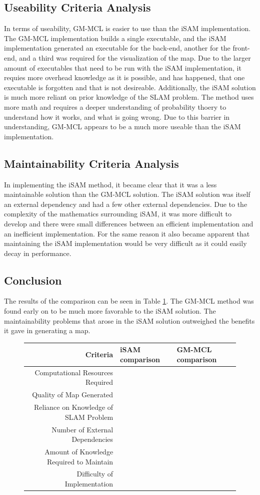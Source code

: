 \documentclass[10pt]{IEEEtran}
\begin{document}
\subsection{Useability Criteria Analysis}
In terms of useability, GM-MCL is easier to use than the iSAM implementation.  The GM-MCL
implementation builds a single executable, and the iSAM implementation generated an
executable for the back-end, another for the front-end, and a third was required for the
visualization of the map.  Due to the larger amount of executables that need to be run with
the iSAM implementation, it requies more overhead knowledge as it is possible, and has happened,
that one executable is forgotten and that is not desireable.  Additionally, the iSAM solution
is much more reliant on prior knowledge of the SLAM problem.  The method uses more math and 
requires a deeper understanding of probability thoery to understand how it works, and what is
going wrong.  Due to this barrier in understanding, GM-MCL appears to be a much more useable
than the iSAM implementation.

\subsection{Maintainability Criteria Analysis}
In implementing the iSAM method, it became clear that it was a less maintainable solution
than the GM-MCL solution.  The iSAM solution was itself an external dependency and had a few 
other external dependencies.  Due to the complexity of the mathematics surrounding iSAM, it
was more difficult to develop and there were small differences between an efficient
implementation and an inefficient implementation.  For the same reason it also became
apparent that maintaining the iSAM implementation would be very difficult as it could easily
decay in performance.

\subsection{Conclusion}
The results of the comparison can be seen in Table \ref{fig:CriteriaComp}.  The GM-MCL
method was found early on to be much more favorable to the iSAM solution.  The maintainability
problems that arose in the iSAM solution outweighed the benefits it gave in generating a map.
\begin{figure}
\begin{tabular} { r | l  | l}
	Criteria & iSAM comparison & GM-MCL comparison \\ 
	\hline Computational Resources Required & &\\
	Quality of Map Generated & &\\
	Reliance on Knowledge of SLAM Problem & &  \\
	Number of External Dependencies  & & \\
	Amount of Knowledge Required to Maintain & & \\
	Difficulty of Implementation & &
\end{tabular}
\label{fig:CriteriaComp}
\end{figure}
\end{document}
